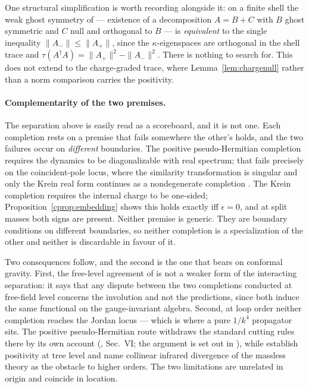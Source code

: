 \documentclass[11pt]{article}
\theoremstyle{definition}
\theoremstyle{remark}
\newcommand{\dg}{\dagger}
\begin{document}
One structural simplification is worth recording alongside it: on a
finite shell the weak ghost symmetry of \cite{BT2026} --- existence of a
decomposition $A=B+C$ with $B$ ghost symmetric and $C$ null and
orthogonal to $B$ --- is \emph{equivalent} to the single inequality
$\|A_-\|\le\|A_+\|$, since the $\kappa$-eigenspaces are orthogonal in
the shell trace and $\tau(A^{\dg}A)=\|A_+\|^2-\|A_-\|^2$.  There is
nothing to search for.  This does not extend to the charge-graded
trace, where Lemma~\ref{lem:chargenull} rather than a norm comparison
carries the positivity.

\paragraph{Complementarity of the two premises.}
The separation above is easily read as a scoreboard, and it is not one.  Each
completion rests on a premise that fails somewhere the other's holds, and the
two failures occur on \emph{different} boundaries.  The positive
pseudo-Hermitian completion requires the dynamics to be diagonalizable with
real spectrum; that fails precisely on the coincident-pole locus, where the
similarity transformation is singular and only the Krein real form continues as
a nondegenerate completion \cite{paperIV}.  The Krein completion requires the
internal charge to be one-sided; Proposition~\ref{cprop:embedding} shows this
holds exactly iff $\epsilon=0$, and at split masses both signs are present.
Neither premise is generic.  They are boundary conditions on different
boundaries, so neither completion is a specialization of the other and neither
is discardable in favour of it.

Two consequences follow, and the second is the one that bears on conformal
gravity.  First, the free-level agreement of \cite{paperIV} is not a weaker
form of the interacting separation: it says that any dispute between the two
completions conducted at free-field level concerns the involution and not the
predictions, since both induce the same functional on the gauge-invariant
algebra.  Second, at loop order neither completion reaches the
Jordan locus --- which is where a pure $1/k^4$ propagator sits.  The positive
pseudo-Hermitian route withdraws the standard cutting rules there by its own
account (\cite{Mannheim2018loops}, Sec.~VI; the argument is set out in
\cite{paperIV}), while \cite{BT2026} establish positivity at tree level and
name collinear infrared divergence of the massless theory as the obstacle to
higher orders.  The two limitations are unrelated in origin and coincide in
location.
\end{document}
